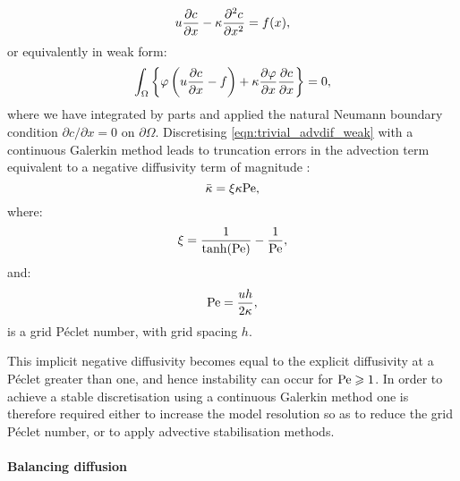 \begin{equation}\label{eqn:trivial_advdif}
  u \frac{\partial c}{\partial x} - \kappa \frac{\partial^2c}{\partial x^2} = f(x),
\end{equation}
or equivalently in weak form:
\begin{equation}\label{eqn:trivial_advdif_weak}
  \int_\Omega \left\{\varphi \left( u \frac{\partial c}{\partial x} -f \right) + \kappa \frac{\partial\varphi}{\partial x} \frac{\partial c}{\partial x}\right\}  = 0,
\end{equation}
where we have integrated by parts and applied the natural Neumann boundary
condition $\partial c / \partial x = 0$ on $\partial \Omega$.
Discretising \eqref{eqn:trivial_advdif_weak} with a continuous Galerkin method
leads to truncation errors in the advection term equivalent to a negative
diffusivity term of magnitude \citep{DoneaBook}:
\begin{equation}\label{eqn:cg_implicit_diffusivity}
  \bar{\kappa} = \xi \kappa \mathrm{Pe},
\end{equation}
where:
\begin{equation}\label{eqn:xi_parameter}
  \xi = \frac{1}{\tanh(\mathrm{Pe})} - \frac{1}{\mathrm{Pe}},
\end{equation}
and:
\begin{equation}\label{eqn:grid_pe}
  \mathrm{Pe} = \frac{u h}{2 \kappa},
\end{equation}
is a grid P\'eclet number, with grid spacing $h$.

This implicit negative diffusivity becomes
equal to the explicit diffusivity at a P\'eclet greater than one, and hence
instability can occur for $\mathrm{Pe} \geqslant 1$. In order to achieve a stable discretisation
using a continuous Galerkin method one is therefore required either to increase
the model resolution so as to reduce the grid P\'eclet number, or to apply
advective stabilisation methods.

\paragraph{Balancing diffusion}\label{sec:balancing_diffusion}

